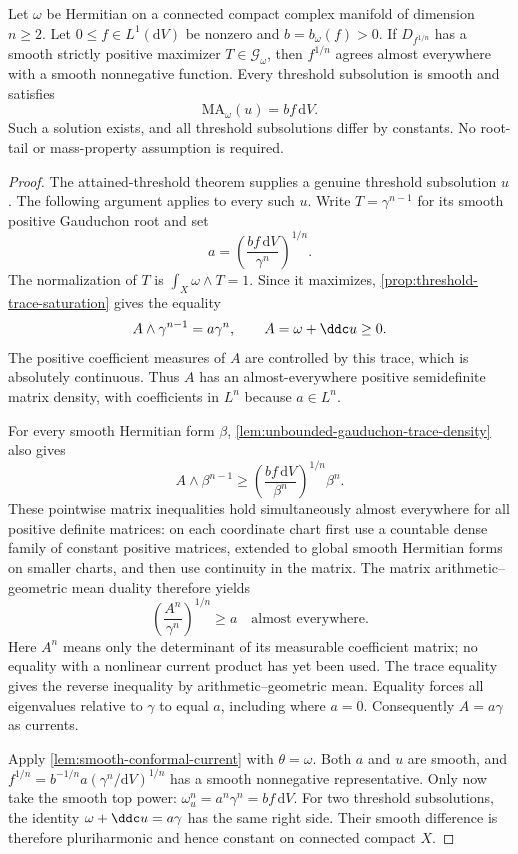 \begin{corollary}\label{cor:smooth-dual-exact-equation}
Let $\omega$ be Hermitian on a connected compact complex manifold of dimension $n\geq2$. Let $0\leq f\in L^1(\mathrm{d}V)$ be nonzero and $b=b_\omega(f)>0$. If $D_{f^{1/n}}$ has a smooth strictly positive maximizer $T\in\mathscr G_\omega$, then $f^{1/n}$ agrees almost everywhere with a smooth nonnegative function. Every threshold subsolution is smooth and satisfies
\[
 \mathrm{MA}_\omega(u)=bf\,\mathrm{d}V.
\]
Such a solution exists, and all threshold subsolutions differ by constants. No root-tail or mass-property assumption is required.
\end{corollary}
\begin{proof}
The attained-threshold theorem supplies a genuine threshold subsolution $u$. The following argument applies to every such $u$. Write $T=\gamma^{n-1}$ for its smooth positive Gauduchon root and set
\[
 a=\left(\frac{bf\,\mathrm{d}V}{\gamma^n}\right)^{1/n}.
\]
The normalization of $T$ is $\int_X\omega\wedge T=1$. Since it maximizes, \cref{prop:threshold-trace-saturation} gives the equality
\[
 A\wedge\gamma^{n-1}=a\gamma^n,
 \qquad A=\omega+\ddc u\geq0.
\]
The positive coefficient measures of $A$ are controlled by this trace, which is absolutely continuous. Thus $A$ has an almost-everywhere positive semidefinite matrix density, with coefficients in $L^n$ because $a\in L^n$.

For every smooth Hermitian form $\beta$, \cref{lem:unbounded-gauduchon-trace-density} also gives
\[
 A\wedge\beta^{n-1}
 \geq\left(\frac{bf\,\mathrm{d}V}{\beta^n}\right)^{1/n}\beta^n.
\]
These pointwise matrix inequalities hold simultaneously almost everywhere for all positive definite matrices: on each coordinate chart first use a countable dense family of constant positive matrices, extended to global smooth Hermitian forms on smaller charts, and then use continuity in the matrix. The matrix arithmetic--geometric mean duality therefore yields
\[
 \left(\frac{A^n}{\gamma^n}\right)^{1/n}\geq a
 \quad\text{almost everywhere}.
\]
Here $A^n$ means only the determinant of its measurable coefficient matrix; no equality with a nonlinear current product has yet been used. The trace equality gives the reverse inequality by arithmetic--geometric mean. Equality forces all eigenvalues relative to $\gamma$ to equal $a$, including where $a=0$. Consequently $A=a\gamma$ as currents.

Apply \cref{lem:smooth-conformal-current} with $\theta=\omega$. Both $a$ and $u$ are smooth, and $f^{1/n}=b^{-1/n}a(\gamma^n/\mathrm{d}V)^{1/n}$ has a smooth nonnegative representative. Only now take the smooth top power: $\omega_u^n=a^n\gamma^n=bf\,\mathrm{d}V$. For two threshold subsolutions, the identity $\omega+\ddc u=a\gamma$ has the same right side. Their smooth difference is therefore pluriharmonic and hence constant on connected compact $X$.
\end{proof}

